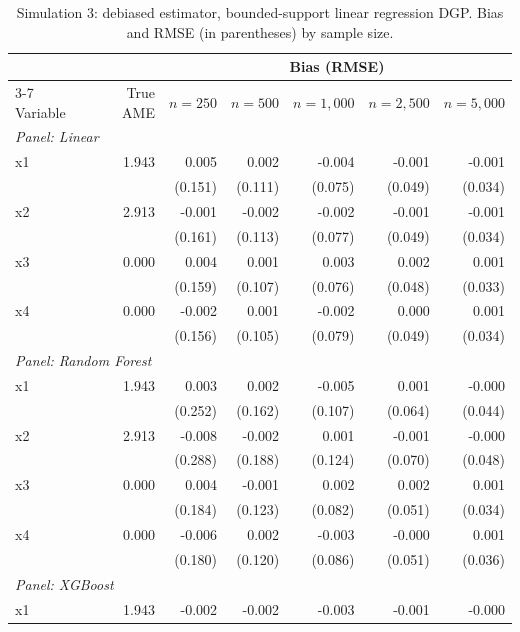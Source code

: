 \begin{table}[htbp]
\centering
\small
\begin{threeparttable}
\caption{Simulation 3: debiased estimator, bounded-support linear regression DGP. Bias and RMSE (in parentheses) by sample size.}
\label{tab:sim3_bias_regression_linear_uniform}
\begin{tabular}{lrrrrrr}
\toprule
 & & \multicolumn{5}{c}{Bias (RMSE)} \\
\cmidrule(lr){3-7}
Variable & True AME & $n=250$ & $n=500$ & $n=1,000$ & $n=2,500$ & $n=5,000$ \\
\midrule
\multicolumn{7}{l}{\textit{Panel: Linear}} \\
\quad x1 & 1.943 & 0.005 & 0.002 & -0.004 & -0.001 & -0.001 \\
 &  & (0.151) & (0.111) & (0.075) & (0.049) & (0.034) \\
\quad x2 & 2.913 & -0.001 & -0.002 & -0.002 & -0.001 & -0.001 \\
 &  & (0.161) & (0.113) & (0.077) & (0.049) & (0.034) \\
\quad x3 & 0.000 & 0.004 & 0.001 & 0.003 & 0.002 & 0.001 \\
 &  & (0.159) & (0.107) & (0.076) & (0.048) & (0.033) \\
\quad x4 & 0.000 & -0.002 & 0.001 & -0.002 & 0.000 & 0.001 \\
 &  & (0.156) & (0.105) & (0.079) & (0.049) & (0.034) \\
\midrule
\multicolumn{7}{l}{\textit{Panel: Random Forest}} \\
\quad x1 & 1.943 & 0.003 & 0.002 & -0.005 & 0.001 & -0.000 \\
 &  & (0.252) & (0.162) & (0.107) & (0.064) & (0.044) \\
\quad x2 & 2.913 & -0.008 & -0.002 & 0.001 & -0.001 & -0.000 \\
 &  & (0.288) & (0.188) & (0.124) & (0.070) & (0.048) \\
\quad x3 & 0.000 & 0.004 & -0.001 & 0.002 & 0.002 & 0.001 \\
 &  & (0.184) & (0.123) & (0.082) & (0.051) & (0.034) \\
\quad x4 & 0.000 & -0.006 & 0.002 & -0.003 & -0.000 & 0.001 \\
 &  & (0.180) & (0.120) & (0.086) & (0.051) & (0.036) \\
\midrule
\multicolumn{7}{l}{\textit{Panel: XGBoost}} \\
\quad x1 & 1.943 & -0.002 & -0.002 & -0.003 & -0.001 & -0.000 \\

\end{tabular}
\end{threeparttable}
\end{table}
